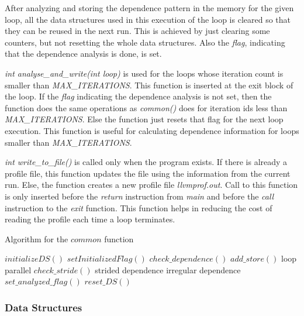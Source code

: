 \documentclass[10pt]{report}          %
\begin{document}
After analyzing and storing the dependence pattern in the memory for the given loop, all the data structures used in this execution of the loop is cleared so that they can be reused in the next run.  This is achieved by just clearing some counters, but not resetting the whole data structures.  Also the \textit{flag}, indicating that the dependence analysis is done, is set.

\textit{int analyse\_and\_write(int loop)} is used for the loops whose iteration count is smaller than \textit{MAX\_ITERATIONS}.  This function is inserted at the exit block of the loop.  If the \textit{flag} indicating the dependence analysis is not set, then the function does the same operations as \textit{common()} does for iteration ids less than \textit{MAX\_ITERATIONS}.  Else the function just resets that flag for the next loop execution.  This function is useful for calculating dependence information for loops smaller than \textit{MAX\_ITERATIONS}.

\textit{int write\_to\_file()}  is called only when the program exists.  If there is already a profile file, this function updates the file using the information from the current run.  Else, the function creates a new profile file \textit{llvmprof.out}.  Call to this function is only inserted before the \textit{return} instruction from \textit{main} and before the \textit{call} instruction to the \textit{exit} function.  This function helps in reducing the cost of reading the profile each time a loop terminates.

\begin{algorithm}
\begin{algorithmic}[1]
\caption{Algorithm for the $common$ function}
\label{alg:common_algo}
		\STATE $initializeDS()$
		\STATE $setInitializedFlag()$
	\ENDIF	
		\STATE $check\_dependence()$
	\ELSE
		\STATE $add\_store()$
	\ENDIF
\ELSE
			\STATE loop parallel
		\ELSE
			\STATE $check\_stride()$
				\STATE strided dependence
			\ELSE
				\STATE irregular dependence
			\ENDIF
		\ENDIF
		\STATE $set\_analyzed\_flag()$
		\STATE $reset\_DS()$
	\ENDIF
\ENDIF

\end{algorithmic}
\end{algorithm}



\subsubsection{Data Structures}
\end{document}
